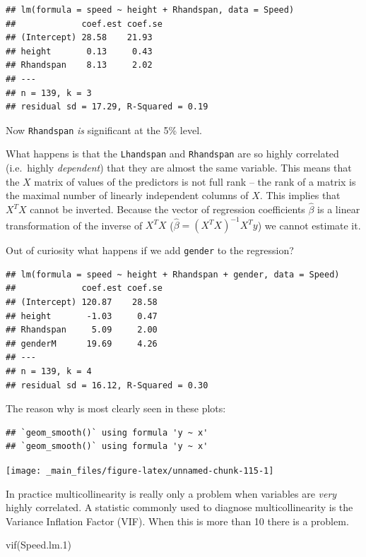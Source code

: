 \documentclass[
]{gitbook}
\newenvironment{Shaded}{\begin{snugshade}}{\end{snugshade}}
\newcommand{\FloatTok}[1]{\textcolor[rgb]{0.00,0.00,0.81}{#1}}
\newcommand{\FunctionTok}[1]{\textcolor[rgb]{0.00,0.00,0.00}{#1}}
\newcommand{\NormalTok}[1]{#1}
\begin{document}
\begin{verbatim}
## lm(formula = speed ~ height + Rhandspan, data = Speed)
##             coef.est coef.se
## (Intercept) 28.58    21.93  
## height       0.13     0.43  
## Rhandspan    8.13     2.02  
## ---
## n = 139, k = 3
## residual sd = 17.29, R-Squared = 0.19
\end{verbatim}

Now \texttt{Rhandspan} \emph{is} significant at the 5\% level.

What happens is that the \texttt{Lhandspan} and \texttt{Rhandspan} are so highly correlated (i.e.~highly \emph{dependent}) that they are almost the same variable. This means that the \(X\) matrix of values of the predictors is not full rank -- the rank of a matrix is the maximal number of linearly independent columns of \(X\). This implies that \(X^TX\) cannot be inverted. Because the vector of regression coefficients \(\hat{\beta}\) is a linear transformation of the inverse of \(X^TX\) (\(\hat {\beta }=(X^T X)^{-1}X^{T}y\)) we cannot estimate it.

Out of curiosity what happens if we add \texttt{gender} to the regression?

\begin{verbatim}
## lm(formula = speed ~ height + Rhandspan + gender, data = Speed)
##             coef.est coef.se
## (Intercept) 120.87    28.58 
## height       -1.03     0.47 
## Rhandspan     5.09     2.00 
## genderM      19.69     4.26 
## ---
## n = 139, k = 4
## residual sd = 16.12, R-Squared = 0.30
\end{verbatim}

The reason why is most clearly seen in these plots:

\begin{verbatim}
## `geom_smooth()` using formula 'y ~ x'
## `geom_smooth()` using formula 'y ~ x'
\end{verbatim}

\begin{center}\texttt{[image: \_main\_files/figure-latex/unnamed-chunk-115-1]} \end{center}

In practice multicollinearity is really only a problem when variables are \emph{very} highly correlated. A statistic commonly used to diagnose multicollinearity is the Variance Inflation Factor (VIF). When this is more than 10 there is a problem.

\begin{Shaded}
\begin{Highlighting}[]
\FunctionTok{vif}\NormalTok{(Speed.lm}\FloatTok{.1}\NormalTok{)}
\end{Highlighting}
\end{Shaded}
\end{document}
